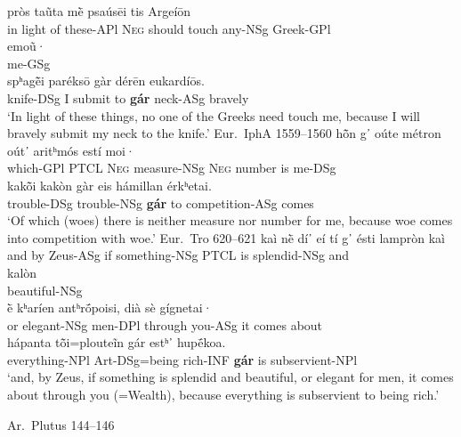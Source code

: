 \documentclass[output=paper,
modfonts
]{LSP/langsci}
\begin{document}
\begin{exe}
\ex\label{lategar}
	\begin{xlist}
	\ex\gll pròs taũta mḕ psaúsēi tis Argeíōn \\
			{in light of} these-APl \textsc{Neg} {should touch} any-NSg Greek-GPl \\

		\gll \hspace*{1em} emoũ· \\
			{} me-GSg \\
	
		\gll {\ob}spʰagē̃i paréksō gàr dérēn eukardíōs. \\
			{\db}knife-DSg {I submit to} \textbf{gár} neck-ASg bravely \\
		\glt `In light of these things, no one of the Greeks need touch me, because I will bravely submit my neck to the knife.' \hfill {Eur.\ IphA 1559--1560}
	\ex\gll hō̃n g᾿ oúte métron oút᾿ aritʰmós estí moi· \\
			which-GPl PTCL \textsc{Neg} measure-NSg \textsc{Neg} number is me-DSg \\

		\gll {\ob}kakō̃i kakòn gàr eis hámillan érkʰetai. \\
			{\db}trouble-DSg trouble-NSg \textbf{gár} to competition-ASg comes \\
		\glt `Of which (woes) there is neither measure nor number for me, because woe comes into competition with woe.' \hfill {Eur.\ Tro 620--621}
	\ex\gll kaì nḕ dí᾽ eí tí g᾽ ésti lampròn kaì \\
			and by Zeus-ASg if something-NSg PTCL is splendid-NSg and \\

		\gll \hspace*{1em} kalòn \\
			 {} beautiful-NSg\\
			
		\gll ḕ kʰaríen antʰrṓpoisi, dià sè gígnetai· \\
			or elegant-NSg men-DPl through you-ASg {it comes about} \\
			
		\gll {\ob}hápanta{\cb} tō̃i=plouteĩn gár estʰ᾽ hupḗkoa. \\
			{\db}everything-NPl {Art-DSg=being rich-INF} \textbf{gár} is subservient-NPl \\
		\glt `and, by Zeus, if something is splendid and beautiful, or elegant for men, it comes about through you (=Wealth), because
everything is subservient to being rich.'

		\vspace*{-\baselineskip}\hfill {Ar.\ Plutus 144--146}
	\end{xlist}
\end{exe}
\end{document}
